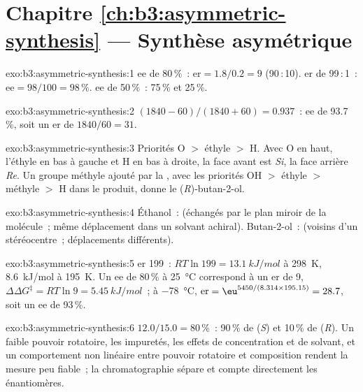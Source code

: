 \section*{Chapitre \ref{ch:b3:asymmetric-synthesis} --- Synthèse asymétrique}

\begin{solution}{exo:b3:asymmetric-synthesis:1}
ee de 80\,\%~: $\mathrm{er} = 1.8/0.2 = 9$ (90\,:\,10). er de 99\,:\,1~: $\mathrm{ee} = 98/100 = 98$\,\%. ee de 50\,\%~: 75\,\% et 25\,\%.
\end{solution}

\begin{solution}{exo:b3:asymmetric-synthesis:2}
$(1840 - 60)/(1840 + 60) = 0.937$~: ee de 93.7\,\%, soit un er de $1840/60 = 31$.
\end{solution}

\begin{solution}{exo:b3:asymmetric-synthesis:3}
Priorités O $>$ éthyle $>$ H. Avec O en haut, l'éthyle en bas à gauche et H en bas à droite, la
face avant est \textit{Si}, la face arrière \textit{Re}. Un groupe méthyle ajouté par la , avec
les priorités OH $>$ éthyle $>$ méthyle $>$ H dans le produit, donne le (\textit{R})-butan-2-ol.
\end{solution}

\begin{solution}{exo:b3:asymmetric-synthesis:4}
Éthanol~:  (échangés par le plan miroir de la molécule~; même
déplacement dans un solvant achiral). Butan-2-ol~:  (voisins
d'un stéréocentre~; déplacements différents).
\end{solution}

\begin{solution}{exo:b3:asymmetric-synthesis:5}
er 199~: $RT\ln 199 = \qty{13.1}{kJ/mol}$ à \qty{298}{K}, \qty{8.6}{kJ/mol} à \qty{195}{K}. Un ee de 80\,\% à \qty{25}{\celsius} correspond à un er de 9,
$\Delta\Delta G^\ddagger = RT\ln 9 = \qty{5.45}{kJ/mol}$~; à \qty{-78}{\celsius}, $\mathrm{er} = \eu^{5450/(8.314 \times 195.15)} = 28.7$, soit un ee de 93\,\%.
\end{solution}

\begin{solution}{exo:b3:asymmetric-synthesis:6}
 $12.0/15.0 = 80$\,\%~: 90\,\% de (\textit{S}) et 10\,\% de (\textit{R}). Un faible pouvoir rotatoire, les impuretés,
les effets de concentration et de solvant, et un comportement non linéaire
entre pouvoir rotatoire et composition rendent la mesure peu fiable~; la
chromatographie sépare et compte directement les énantiomères.
\end{solution}

